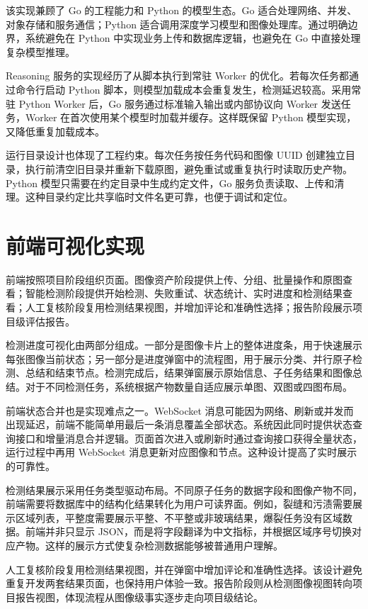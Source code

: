 该实现兼顾了 Go 的工程能力和 Python 的模型生态。Go 适合处理网络、并发、对象存储和服务通信；Python 适合调用深度学习模型和图像处理库。通过明确边界，系统避免在 Python 中实现业务上传和数据库逻辑，也避免在 Go 中直接处理复杂模型推理。

Reasoning 服务的实现经历了从脚本执行到常驻 Worker 的优化。若每次任务都通过命令行启动 Python 脚本，则模型加载成本会重复发生，检测延迟较高。采用常驻 Python Worker 后，Go 服务通过标准输入输出或内部协议向 Worker 发送任务，Worker 在首次使用某个模型时加载并缓存。这样既保留 Python 模型实现，又降低重复加载成本。

运行目录设计也体现了工程约束。每次任务按任务代码和图像 UUID 创建独立目录，执行前清空旧目录并重新下载原图，避免重试或重复执行时读取历史产物。Python 模型只需要在约定目录中生成约定文件，Go 服务负责读取、上传和清理。这种目录约定比共享临时文件名更可靠，也便于调试和定位。

\section{前端可视化实现}
\label{sec:impl-frontend}

前端按照项目阶段组织页面。图像资产阶段提供上传、分组、批量操作和原图查看；智能检测阶段提供开始检测、失败重试、状态统计、实时进度和检测结果查看；人工复核阶段复用检测结果视图，并增加评论和准确性选择；报告阶段展示项目级评估报告。

检测进度可视化由两部分组成。一部分是图像卡片上的整体进度条，用于快速展示每张图像当前状态；另一部分是进度弹窗中的流程图，用于展示分类、并行原子检测、总结和结束节点。检测完成后，结果弹窗展示原始信息、子任务结果和图像总结。对于不同检测任务，系统根据产物数量自适应展示单图、双图或四图布局。

前端状态合并也是实现难点之一。WebSocket 消息可能因为网络、刷新或并发而出现延迟，前端不能简单用最后一条消息覆盖全部状态。系统因此同时提供状态查询接口和增量消息合并逻辑。页面首次进入或刷新时通过查询接口获得全量状态，运行过程中再用 WebSocket 消息更新对应图像和节点。这种设计提高了实时展示的可靠性。

检测结果展示采用任务类型驱动布局。不同原子任务的数据字段和图像产物不同，前端需要将数据库中的结构化结果转化为用户可读界面。例如，裂缝和污渍需要展示区域列表，平整度需要展示平整、不平整或非玻璃结果，爆裂任务没有区域数据。前端并非只显示 JSON，而是将字段翻译为中文指标，并根据区域序号切换对应产物。这样的展示方式使复杂检测数据能够被普通用户理解。

人工复核阶段复用检测结果视图，并在弹窗中增加评论和准确性选择。该设计避免重复开发两套结果页面，也保持用户体验一致。报告阶段则从检测图像视图转向项目报告视图，体现流程从图像级事实逐步走向项目级结论。

